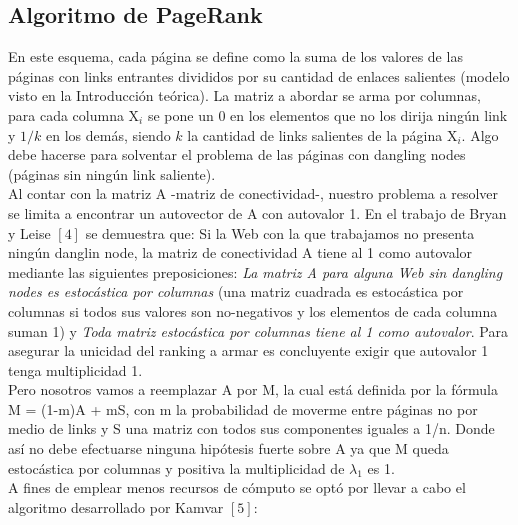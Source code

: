 \documentclass[a4paper]{article}
\begin{document}
\newpage
\subsection{Algoritmo de PageRank}


\indent En este esquema, cada p\'agina se define como la suma de los valores de las p\'aginas con links entrantes divididos por su cantidad de enlaces salientes (modelo visto en la Introducci\'on te\'orica). La matriz a abordar se arma por columnas, para cada columna X$_i$ se pone un 0 en los elementos que no los dirija ning\'un link y $1/k$ en los dem\'as, siendo $k$ la cantidad de links salientes de la p\'agina X$_i$. Algo debe hacerse para solventar el problema de las p\'aginas con dangling nodes (p\'aginas sin ning\'un link saliente).\\
\indent Al contar con la matriz A -matriz de conectividad-, nuestro problema a resolver se limita a encontrar un autovector de A con autovalor 1. En el trabajo de Bryan y Leise $[4]$ se demuestra que: Si la Web con la que trabajamos no presenta ning\'un danglin node, la matriz de conectividad A tiene al 1 como autovalor mediante las siguientes preposiciones: \emph{La matriz A para alguna Web sin dangling nodes es estoc\'astica por columnas} (una matriz cuadrada es estoc\'astica por columnas si todos sus valores son no-negativos y los elementos de cada columna suman 1) y \emph{Toda matriz estoc\'astica por columnas tiene al 1 como autovalor}. Para asegurar la unicidad del ranking a armar es concluyente exigir que autovalor 1 tenga multiplicidad 1. \\
\indent Pero nosotros vamos a reemplazar A por M, la cual est\'a definida por la f\'ormula M = (1-m)A +  mS, con m la probabilidad de moverme entre p\'aginas no por medio de links y S una matriz con todos sus componentes iguales a 1/n. Donde as\'i no debe efectuarse ninguna hip\'otesis fuerte sobre A ya que M queda estoc\'astica por columnas y positiva la multiplicidad de $\lambda_1$ es 1. \\
\indent A fines de emplear menos recursos de c\'omputo se opt\'o por llevar a cabo el algoritmo desarrollado por Kamvar $[5]$:
\end{document}
